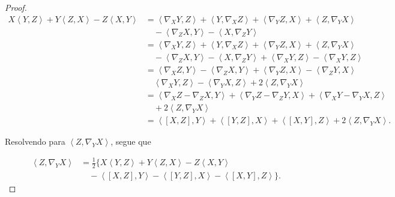 \begin{theorem}
\begin{proof}
        \begin{align*}
            X\left<Y,Z\right> +Y\left<Z,X\right> -Z\left<X,Y\right> & = \left<\nabla_{X}Y,Z\right> +\left<Y,\nabla_{X}Z\right> + \left<\nabla_{Y}Z,X\right> + \left<Z,\nabla_{Y}X\right>       \\
                                                                    & \quad - \left<\nabla_{Z}X,Y\right> - \left<X,\nabla_{Z}Y\right>                                                          \\
                                                                    & = \left<\nabla_{X}Y,Z\right> +\left<Y,\nabla_{X}Z\right> + \left<\nabla_{Y}Z,X\right> + \left<Z,\nabla_{Y}X\right>       \\
                                                                    & \quad - \left<\nabla_{Z}X,Y\right> - \left<X,\nabla_{Z}Y\right>+ \left<\nabla_{X}Y,Z\right> - \left<\nabla_{X}Y,Z\right> \\
                                                                    & =\left<\nabla_{X}Z,Y\right>-\left<\nabla_{Z}X,Y\right> +\left<\nabla_{Y}Z,X\right> -\left<\nabla_{Z}Y,X\right>           \\
                                                                    & \quad \left<\nabla_{X}Y,Z\right> - \left<\nabla_{Y}X,Z\right> +2\left<Z,\nabla_{Y}X\right>                               \\
                                                                    & = \left<\nabla_{X}Z-\nabla_{Z}X,Y\right> + \left<\nabla_{Y}Z-\nabla_{Z}Y,X\right>+\left<\nabla_{X}Y-\nabla_{Y}X,Z\right> \\
                                                                    & \quad +2 \left<Z,\nabla_{Y}X\right>                                                                                      \\
                                                                    & = \left<[X,Z],Y\right> + \left<[Y,Z],X\right> +\left<[X,Y],Z\right> +2 \left<Z,\nabla_{Y}X\right>.
        \end{align*}

        Resolvendo para $\left<Z,\nabla_{Y}X\right>$, segue que

        \begin{align*}
            \left<Z,\nabla_{Y}X\right> & =\frac{1}{2} \{X\left<Y,Z\right> +Y\left<Z,X\right> -Z\left<X,Y\right>                 \\
                                       & \quad - \left<[X,Z],Y\right> - \left<[Y,Z],X\right> -\left<[X,Y],Z\right>  \}. \tag{4}
        \end{align*}


\end{proof}
\end{theorem}
